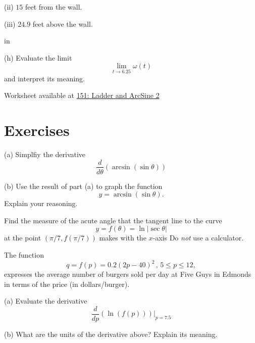 \documentclass{ximera}
\newcommand{\pskip}{\vskip 0.1 in}
\begin{document}
\begin{question}
     (ii) $15$ feet from the wall.

     (iii) $24.9$ feet above the wall.

\pskip

(h) Evaluate the limit
\[
   \lim_{t\to 6.25} \omega(t) 
\]
and interpret its meaning.
 


\begin{onlineOnly}
    \begin{center}
\end{center}
\end{onlineOnly}

Worksheet available at \href{https://www.desmos.com/calculator/egolipj5qg}{151: Ladder and ArcSine 2}

\end{question}


\section*{Exercises}

\begin{question}  \label{Qfdgtnn}
(a) Simplfiy the derivative
\[
     \frac{d}{d\theta}\left(  \arcsin(\sin \theta) \right)
\]

(b) Use the result of part (a) to graph the function
\[
        y = \arcsin (\sin\theta) .
\] 
Explain your reasoning.
\end{question}

\begin{question} \label{QWcsdefv3e354}
Find the measure of the acute angle that the tangent line to the curve
\[
      y = f(\theta) = \ln |\sec\theta|
\]
at the point $(\pi/7, f(\pi/7))$ makes with the $x$-axis Do \emph{not} use a calculator.
\end{question}


\begin{question}   \label{QDfd6mbqs}
The function
\[
       q = f(p) = 0.2 \left( 2p-40 \right)^2 \, , \, 5\leq p \leq 12 ,
\]
expresses the average number of burgers sold per day at Five Guys in Edmonds in terms of the price (in dollars/burger).

(a) Evaluate the derivative
\[
        \frac{d}{dp} \left(  \ln (f(p)) \right)\Big|_{p=7.5}
\]

(b) What are the units of the derivative above? Explain its meaning.
\end{question}
\end{document}

